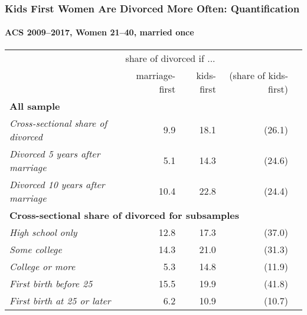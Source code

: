 \documentclass[aspectratio=169]{beamer}
\begin{document}
\begin{frame}
\frametitle{Kids First Women Are Divorced More Often: Quantification}
\framesubtitle{ACS 2009--2017, Women 21--40, married once}
\begin{center}
\begin{tabular}{l r r r r }
\hline
& \multicolumn{2}{c}{share of divorced if ... }&  \\
&  marriage-first & kids-first & (share of kids-first) &  \\\hline
\multicolumn{5}{l}{\textbf{All sample}} \\\hline
\textit{Cross-sectional share of divorced} &  9.9 & 18.1 & (26.1) \\
\textit{Divorced 5 years after marriage} &  5.1 & 14.3  & (24.6) \\
\textit{Divorced 10 years after marriage} & 10.4 & 22.8 & (24.4) \\\hline
\multicolumn{5}{l}{\textbf{Cross-sectional share of divorced for subsamples}} \\\hline
\textit{High school only} &  12.8 & 17.3 & (37.0) \\
\textit{Some college} & 14.3 & 21.0 & (31.3) \\
\textit{College or more} &   5.3 & 14.8 & (11.9) \\\hline
\textit{First birth before 25} & 15.5 & 19.9 & (41.8) \\
\textit{First birth at 25 or later} &  6.2 & 10.9 & (10.7)  \\\hline
\end{tabular}
\end{center}
\end{frame}
\end{document}
